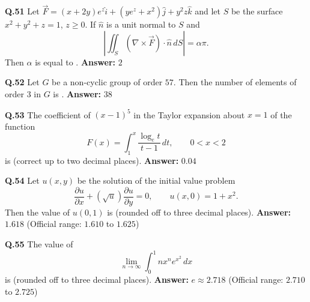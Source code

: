 \documentclass[11pt,a4paper]{article}
\newcommand{\ans}[1]{\textbf{Answer:} #1\par\medskip}
\begin{document}
\textbf{Q.51} Let $\vec{F} = (x + 2y)e^z \hat{i} + (ye^z + x^2)\hat{j} + y^2 z \hat{k}$ and let $S$ be the surface $x^2 + y^2 + z = 1$, $z \ge 0$. If $\hat{n}$ is a unit normal to $S$ and
\[
  \left|\iint_S (\nabla \times \vec{F}) \cdot \hat{n}\,dS\right| = \alpha\pi.
\]
Then $\alpha$ is equal to \underline{\hspace{2cm}}.
\ans{$2$}

\textbf{Q.52} Let $G$ be a non-cyclic group of order $57$. Then the number of elements of order $3$ in $G$ is \underline{\hspace{2cm}}.
\ans{$38$}

\textbf{Q.53} The coefficient of $(x - 1)^5$ in the Taylor expansion about $x = 1$ of the function
\[
  F(x) = \int_1^x \frac{\log_e t}{t - 1}\,dt, \qquad 0 < x < 2
\]
is \underline{\hspace{2cm}} (correct up to two decimal places).
\ans{$0.04$}

\textbf{Q.54} Let $u(x, y)$ be the solution of the initial value problem
\[
  \frac{\partial u}{\partial x} + (\sqrt{u})\frac{\partial u}{\partial y} = 0, \qquad u(x, 0) = 1 + x^2.
\]
Then the value of $u(0, 1)$ is \underline{\hspace{2cm}} (rounded off to three decimal places).
\ans{$1.618$ (Official range: $1.610$ to $1.625$)}

\textbf{Q.55} The value of
\[
  \lim_{n\to\infty} \int_0^1 n x^n e^{x^2}\,dx
\]
is \underline{\hspace{2cm}} (rounded off to three decimal places).
\ans{$e \approx 2.718$ (Official range: $2.710$ to $2.725$)}
\end{document}
